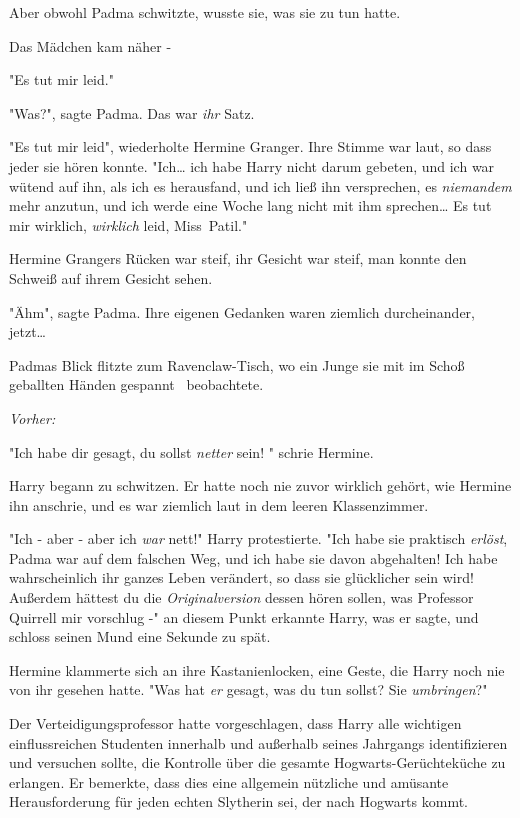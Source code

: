 {Aber obwohl Padma schwitzte, wusste sie, was sie zu tun hatte.

Das Mädchen kam näher -

"Es tut mir leid."

"Was?", sagte Padma. Das war \emph{ihr} Satz.

"Es tut mir leid", wiederholte Hermine Granger. Ihre Stimme war laut, so dass jeder sie hören konnte. "Ich… ich habe Harry nicht darum gebeten, und ich war wütend auf ihn, als ich es herausfand, und ich ließ ihn versprechen, es \emph{niemandem} mehr anzutun, und ich werde eine Woche lang nicht mit ihm sprechen… Es tut mir wirklich, \emph{wirklich} leid, Miss~Patil."

Hermine Grangers Rücken war steif, ihr Gesicht war steif, man konnte den Schweiß auf ihrem Gesicht sehen.

"Ähm", sagte Padma. Ihre eigenen Gedanken waren ziemlich durcheinander, jetzt…

Padmas Blick flitzte zum Ravenclaw-Tisch, wo ein Junge sie mit im Schoß geballten Händen gespannt ~beobachtete.

\emph{Vorher:}

"Ich habe dir gesagt, du sollst \emph{netter} sein! " schrie Hermine.

Harry begann zu schwitzen. Er hatte noch nie zuvor wirklich gehört, wie Hermine ihn anschrie, und es war ziemlich laut in dem leeren Klassenzimmer.

"Ich - aber - aber ich \emph{war} nett!" Harry protestierte. "Ich habe sie praktisch \emph{erlöst}, Padma war auf dem falschen Weg, und ich habe sie davon abgehalten! Ich habe wahrscheinlich ihr ganzes Leben verändert, so dass sie glücklicher sein wird! Außerdem hättest du die \emph{Originalversion} dessen hören sollen, was Professor Quirrell mir vorschlug -" an diesem Punkt erkannte Harry, was er sagte, und schloss seinen Mund eine Sekunde zu spät.

Hermine klammerte sich an ihre Kastanienlocken, eine Geste, die Harry noch nie von ihr gesehen hatte. "Was hat \emph{er} gesagt, was du tun sollst? Sie \emph{umbringen}?"

Der Verteidigungsprofessor hatte vorgeschlagen, dass Harry alle wichtigen einflussreichen Studenten innerhalb und außerhalb seines Jahrgangs identifizieren und versuchen sollte, die Kontrolle über die gesamte Hogwarts-Gerüchteküche zu erlangen. Er bemerkte, dass dies eine allgemein nützliche und amüsante Herausforderung für jeden echten Slytherin sei, der nach Hogwarts kommt.

}

